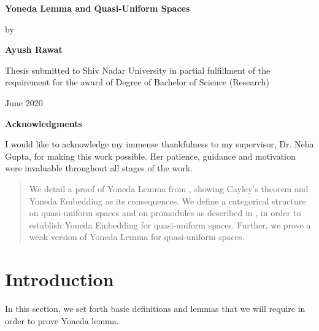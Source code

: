 \documentclass[a4paper]{article}
\theoremstyle{definition}
\begin{document}
\begin{titlepage}
    \begin{center}
        \vspace*{1cm}

        \Huge
        \textbf{Yoneda Lemma and Quasi-Uniform Spaces}

        \vspace{0.5cm}
        \LARGE
	by
        \vspace{1.5cm}

        \textbf{Ayush Rawat}

        \vfill

	Thesis submitted to Shiv Nadar University in partial fulfillment of the requirement
	for the award of Degree of Bachelor of Science (Research)
        \vspace{0.8cm}


        \Large
	June 2020

    \end{center}
\end{titlepage}
\begin{titlepage}
	\begin{center}
		\vspace*{1cm}

		\Huge
		\textbf{Acknowledgments}

	\end{center}
		\vspace{2cm}
		\LARGE
		I would like to acknowledge my immense thankfulness to my supervisor,
		Dr. Neha Gupta, for making this work possible.
		Her patience, guidance and motivation were invaluable throughout all stages of the work.
		\vfill
\end{titlepage}
\thispagestyle{empty}
\newpage
\begin{abstract}
	We detail a proof of Yoneda Lemma from \cite{Tom}, showing Cayley's theorem and
	Yoneda Embedding as its consequences. We define a
	categorical structure on quasi-uniform spaces and on promodules as described in
	\cite{Clementino_Hofmann_2011}, in order to establish Yoneda
	Embedding for quasi-uniform spaces. Further, we prove a weak version of Yoneda Lemma
	for quasi-uniform spaces.
\end{abstract}
\tableofcontents
\section{Introduction}

In this section, we set forth basic definitions and lemmas that we will require in
order to prove Yoneda lemma.
\end{document}
